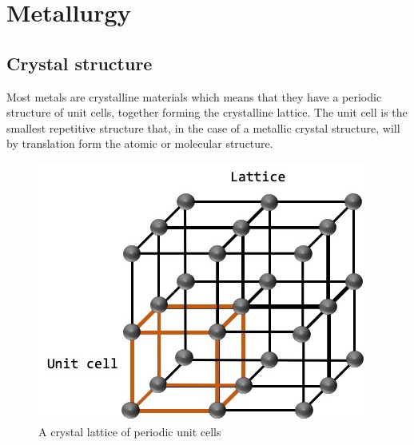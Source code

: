 \documentclass{article}
\begin{document}
\section{Metallurgy}
\label{section:Metallurgy}
\subsection{Crystal structure}
Most metals are crystalline materials which means that they have a periodic structure of unit cells, together forming the crystalline lattice. The unit cell is the smallest repetitive structure that, in the case of a metallic crystal structure, will by translation form the atomic or molecular structure. 

\begin{figure}[h!]
    \includegraphics[width=\linewidth]{Unitcell.jpg}
    \caption{A crystal lattice of periodic unit cells}
    \label{fig:Unitcell}

\end{figure}
\end{document}
